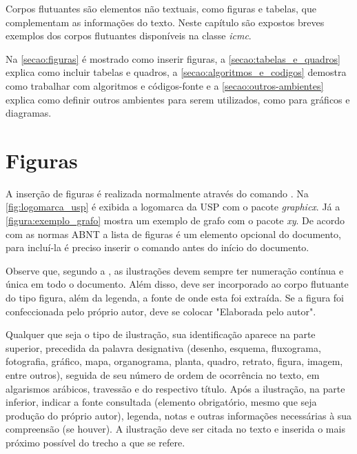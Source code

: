 
Corpos flutuantes são elementos não textuais, como figuras e tabelas, que complementam as informações do texto. Neste capítulo são expostos breves exemplos dos corpos flutuantes disponíveis na classe \textit{icmc}.

Na \autoref{secao:figuras} é mostrado como inserir figuras, a \autoref{secao:tabelas_e_quadros} explica como incluir tabelas e quadros, a \autoref{secao:algoritmos_e_codigos} demostra como trabalhar com algoritmos e códigos-fonte e a \autoref{secao:outros-ambientes} explica como definir outros ambientes para serem utilizados, como para gráficos e diagramas.

\section{Figuras}
\label{secao:figuras}

A inserção de figuras é realizada normalmente através do comando . Na \autoref{fig:logomarca_usp} é exibida a logomarca da USP com o pacote \textit{graphicx}. Já a \autoref{figura:exemplo_grafo} mostra um exemplo de grafo com o pacote \textit{xy}. De acordo com as normas ABNT a lista de figuras é um elemento opcional do documento, para incluí-la é preciso inserir o comando  antes do início do documento.

Observe que, segundo a , as
ilustrações devem sempre ter numeração contínua e única em todo o documento. Além disso, deve ser incorporado ao corpo flutuante do tipo figura, além da legenda, a fonte de onde esta foi extraída. Se a figura foi confeccionada pelo próprio autor, deve se colocar "Elaborada pelo autor".

\begin{citacao}
Qualquer que seja o tipo de ilustração, sua identificação aparece na parte
superior, precedida da palavra designativa (desenho, esquema, fluxograma,
fotografia, gráfico, mapa, organograma, planta, quadro, retrato, figura,
imagem, entre outros), seguida de seu número de ordem de ocorrência no texto,
em algarismos arábicos, travessão e do respectivo título. Após a ilustração, na
parte inferior, indicar a fonte consultada (elemento obrigatório, mesmo que
seja produção do próprio autor), legenda, notas e outras informações
necessárias à sua compreensão (se houver). A ilustração deve ser citada no
texto e inserida o mais próximo possível do trecho a que se
refere. \cite[seções 5.8]{NBR14724:2011}
\end{citacao}

